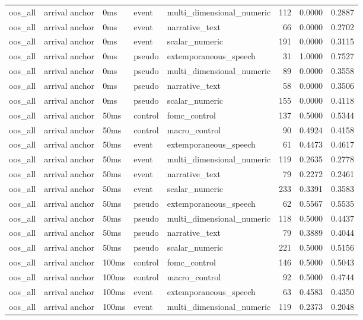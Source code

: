 \begin{tabular}{lllllrrr}
oos_all & arrival anchor & 0ms & event & multi_dimensional_numeric & 112 & 0.0000 & 0.2887 \\
oos_all & arrival anchor & 0ms & event & narrative_text & 66 & 0.0000 & 0.2702 \\
oos_all & arrival anchor & 0ms & event & scalar_numeric & 191 & 0.0000 & 0.3115 \\
oos_all & arrival anchor & 0ms & pseudo & extemporaneous_speech & 31 & 1.0000 & 0.7527 \\
oos_all & arrival anchor & 0ms & pseudo & multi_dimensional_numeric & 89 & 0.0000 & 0.3558 \\
oos_all & arrival anchor & 0ms & pseudo & narrative_text & 58 & 0.0000 & 0.3506 \\
oos_all & arrival anchor & 0ms & pseudo & scalar_numeric & 155 & 0.0000 & 0.4118 \\
oos_all & arrival anchor & 50ms & control & fomc_control & 137 & 0.5000 & 0.5344 \\
oos_all & arrival anchor & 50ms & control & macro_control & 90 & 0.4924 & 0.4158 \\
oos_all & arrival anchor & 50ms & event & extemporaneous_speech & 61 & 0.4473 & 0.4617 \\
oos_all & arrival anchor & 50ms & event & multi_dimensional_numeric & 119 & 0.2635 & 0.2778 \\
oos_all & arrival anchor & 50ms & event & narrative_text & 79 & 0.2272 & 0.2461 \\
oos_all & arrival anchor & 50ms & event & scalar_numeric & 233 & 0.3391 & 0.3583 \\
oos_all & arrival anchor & 50ms & pseudo & extemporaneous_speech & 62 & 0.5567 & 0.5535 \\
oos_all & arrival anchor & 50ms & pseudo & multi_dimensional_numeric & 118 & 0.5000 & 0.4437 \\
oos_all & arrival anchor & 50ms & pseudo & narrative_text & 79 & 0.3889 & 0.4044 \\
oos_all & arrival anchor & 50ms & pseudo & scalar_numeric & 221 & 0.5000 & 0.5156 \\
oos_all & arrival anchor & 100ms & control & fomc_control & 146 & 0.5000 & 0.5043 \\
oos_all & arrival anchor & 100ms & control & macro_control & 92 & 0.5000 & 0.4744 \\
oos_all & arrival anchor & 100ms & event & extemporaneous_speech & 63 & 0.4583 & 0.4350 \\
oos_all & arrival anchor & 100ms & event & multi_dimensional_numeric & 119 & 0.2373 & 0.2048 \\

\end{tabular}
